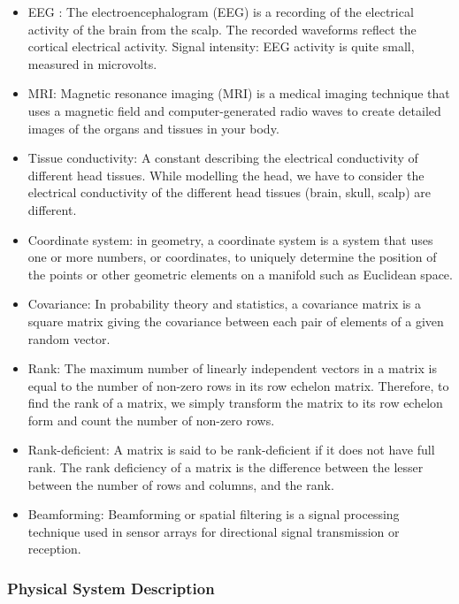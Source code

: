 \documentclass[12pt]{article}
\begin{document}
\begin{itemize} 

\item EEG : The electroencephalogram (EEG) is a recording of the electrical activity of the brain from the scalp. The recorded waveforms reflect the cortical electrical activity. Signal intensity: EEG activity is quite small, measured in microvolts.

\item MRI: Magnetic resonance imaging (MRI) is a medical imaging technique that uses a magnetic field and computer-generated radio waves to create detailed images of the organs and tissues in your body.

\item Tissue conductivity: A constant describing the electrical conductivity of different head tissues.  While modelling the head, we have to consider the electrical conductivity of the different head tissues (brain, skull, scalp) are different. 

\item Coordinate system: in geometry, a coordinate system is a system that uses one or more numbers, or coordinates, to uniquely determine the position of the points or other geometric elements on a manifold such as Euclidean space.

\item Covariance: In probability theory and statistics, a covariance matrix is a square matrix giving the covariance between each pair of elements of a given random vector.

\item Rank: The maximum number of linearly independent vectors in a matrix is equal to the number of non-zero rows in its row echelon matrix. Therefore, to find the rank of a matrix, we simply transform the matrix to its row echelon form and count the number of non-zero rows.

\item Rank-deficient: A matrix is said to be rank-deficient if it does not have full rank. The rank deficiency of a matrix is the difference between the lesser between the number of rows and columns, and the rank.

\item Beamforming:  Beamforming or spatial filtering is a signal processing technique used in sensor arrays for directional signal transmission or reception.

\end{itemize}

\subsubsection{Physical System Description} \label{sec_phySystDescrip}
\end{document}
